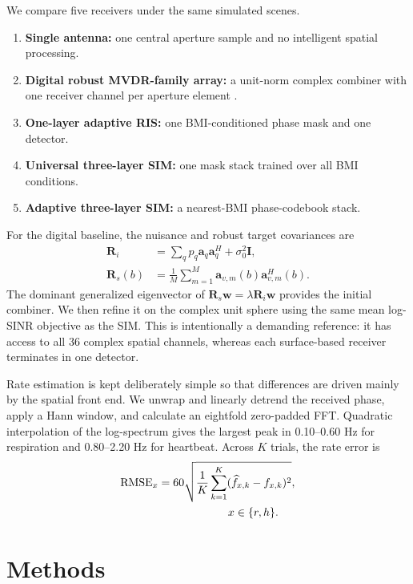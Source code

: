 \documentclass[pdflatex,sn-nature]{sn-jnl}
\newcommand{\vect}[1]{\bm{#1}}
\begin{document}
We compare five receivers under the same simulated scenes.
\begin{enumerate}
    \item \textbf{Single antenna:} one central aperture sample and no intelligent
    spatial processing.
    \item \textbf{Digital robust MVDR-family array:} a unit-norm complex combiner
    with one receiver channel per aperture element \cite{capon1969mvdr}.
    \item \textbf{One-layer adaptive RIS:} one BMI-conditioned phase mask and one
    detector.
    \item \textbf{Universal three-layer SIM:} one mask stack trained over all BMI
    conditions.
    \item \textbf{Adaptive three-layer SIM:} a nearest-BMI phase-codebook stack.
\end{enumerate}

For the digital baseline, the nuisance and robust target covariances are
\begin{align}
\vect R_i&=\sum_q p_q\vect a_q\vect a_q^H+\sigma_0^2\vect I,\\
\vect R_s(b)&=\frac{1}{M}\sum_{m=1}^{M}
\vect a_{v,m}(b)\vect a_{v,m}^H(b).
\end{align}
The dominant generalized eigenvector of
$\vect R_s\vect w=\lambda\vect R_i\vect w$ provides the initial combiner. We then
refine it on the complex unit sphere using the same mean log-SINR objective as the
SIM. This is intentionally a demanding reference: it has access to all 36 complex
spatial channels, whereas each surface-based receiver terminates in one detector.

Rate estimation is kept deliberately simple so that differences are driven mainly by
the spatial front end. We unwrap and linearly detrend the received phase, apply a Hann
window, and calculate an eightfold zero-padded FFT. Quadratic interpolation of the
log-spectrum gives the largest peak in 0.10--0.60 Hz for respiration and
0.80--2.20 Hz for heartbeat. Across $K$ trials, the rate error is
\begin{equation}
\begin{aligned}
\operatorname{RMSE}_x
&=60\sqrt{\frac{1}{K}\sum_{k=1}^{K}
(\widehat f_{x,k}-f_{x,k})^2},\\
&\hspace{22mm}x\in\{r,h\}.
\end{aligned}
\label{eq:rmse}
\end{equation}

\section{Methods}
\end{document}
